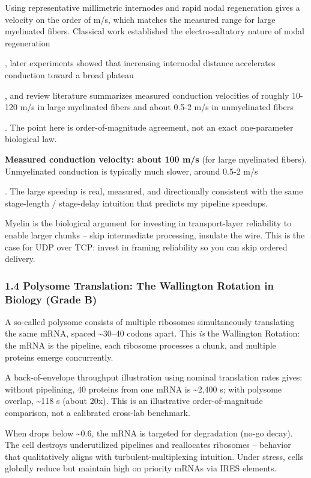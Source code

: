 \documentclass[
]{article}
\begin{document}
Using representative millimetric internodes and rapid nodal regeneration
gives a velocity on the order of m/s, which matches the measured range
for large myelinated fibers. Classical work established the
electro-saltatory nature of nodal regeneration

, later experiments showed that increasing internodal distance
accelerates conduction toward a broad plateau

, and review literature summarizes measured conduction velocities of
roughly 10-120 m/s in large myelinated fibers and about 0.5-2 m/s in
unmyelinated fibers

. The point here is order-of-magnitude agreement, not an exact
one-parameter biological law.

\textbf{Measured conduction velocity: about 100 m/s} (for large
myelinated fibers). Unmyelinated conduction is typically much slower,
around 0.5-2 m/s

. The large speedup is real, measured, and directionally consistent with
the same stage-length / stage-delay intuition that predicts my pipeline
speedups.

Myelin is the biological argument for investing in transport-layer
reliability to enable larger chunks -- skip intermediate processing,
insulate the wire. This is the case for UDP over TCP: invest in framing
reliability so you can skip ordered delivery.

\subsubsection{\texorpdfstring{\textbf{1.4 Polysome Translation: The
Wallington Rotation in Biology (Grade
B)}}{1.4 Polysome Translation: The Wallington Rotation in Biology (Grade B)}}\label{polysome-translation-the-wallington-rotation-in-biology-grade-b}

A so-called polysome consists of multiple ribosomes simultaneously
translating the same mRNA, spaced \textasciitilde30--40 codons apart.
This \emph{is} the Wallington Rotation: the mRNA is the pipeline, each
ribosome processes a chunk, and multiple proteins emerge concurrently.

A back-of-envelope throughput illustration using nominal translation
rates gives: without pipelining, 40 proteins from one mRNA is
\textasciitilde2,400 s; with polysome overlap, \textasciitilde118 s
(about 20x). This is an illustrative order-of-magnitude comparison, not
a calibrated cross-lab benchmark.

When drops below \textasciitilde0.6, the mRNA is targeted for
degradation (no-go decay). The cell destroys underutilized pipelines and
reallocates ribosomes -- behavior that qualitatively aligns with
turbulent-multiplexing intuition. Under stress, cells globally reduce
but maintain high on priority mRNAs via IRES elements.
\end{document}
